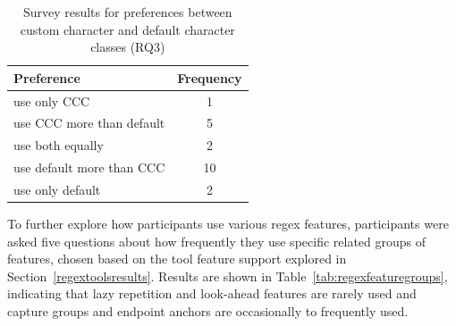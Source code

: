 \begin{table}
\caption{Survey results for preferences between custom character and default character classes (RQ3) \label{tab:cccvsdefault}}
\begin{center}
\begin{small}
\begin{tabular}{l|c}
\toprule
\textbf{Preference} & \textbf{Frequency} \\  \hline \bigstrut
use only CCC & 1\\ \hline \bigstrut
use CCC more than default & 5 \\ \hline \bigstrut
use both equally & 2\\ \hline \bigstrut
use default more than CCC & 10\\ \hline \bigstrut
use only default & 2\\
\bottomrule
\end{tabular}
\end{small}
\end{center}
\vspace{-12pt}
\end{table}

To further explore how participants use various regex features, participants were asked five questions about how frequently they use specific related groups of features,
chosen based on the tool feature support explored in Section~\ref{regextoolsresults}.
Results are shown in Table~\ref{tab:regexfeaturegroups}, indicating that lazy repetition and look-ahead features are rarely used and capture groups and endpoint anchors are occasionally to frequently used.


